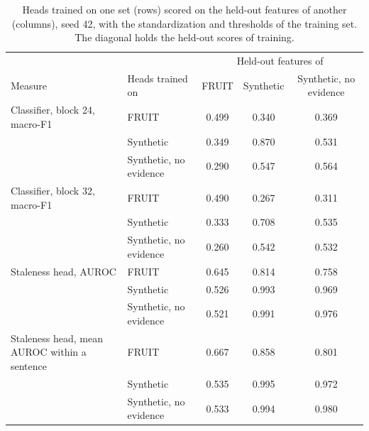 \documentclass[]{paper}
\begin{document}
\begin{table}[H]
\caption{Heads trained on one set (rows) scored on the held-out features of another (columns), seed 42, with the standardization and thresholds of the training set. The diagonal holds the held-out scores of training.}
\label{tab:transfer}
\centering
\footnotesize
\begin{tabular}{llccc}
\toprule
 & & \multicolumn{3}{c}{Held-out features of} \\
Measure & Heads trained on & FRUIT & Synthetic & Synthetic, no evidence \\
\midrule
Classifier, block 24, macro-F1 & FRUIT & 0.499 & 0.340 & 0.369 \\
 & Synthetic & 0.349 & 0.870 & 0.531 \\
 & Synthetic, no evidence & 0.290 & 0.547 & 0.564 \\
\midrule
Classifier, block 32, macro-F1 & FRUIT & 0.490 & 0.267 & 0.311 \\
 & Synthetic & 0.333 & 0.708 & 0.535 \\
 & Synthetic, no evidence & 0.260 & 0.542 & 0.532 \\
\midrule
Staleness head, AUROC & FRUIT & 0.645 & 0.814 & 0.758 \\
 & Synthetic & 0.526 & 0.993 & 0.969 \\
 & Synthetic, no evidence & 0.521 & 0.991 & 0.976 \\
\midrule
Staleness head, mean AUROC within a sentence & FRUIT & 0.667 & 0.858 & 0.801 \\
 & Synthetic & 0.535 & 0.995 & 0.972 \\
 & Synthetic, no evidence & 0.533 & 0.994 & 0.980 \\
\bottomrule
\end{tabular}
\end{table}
\end{document}
